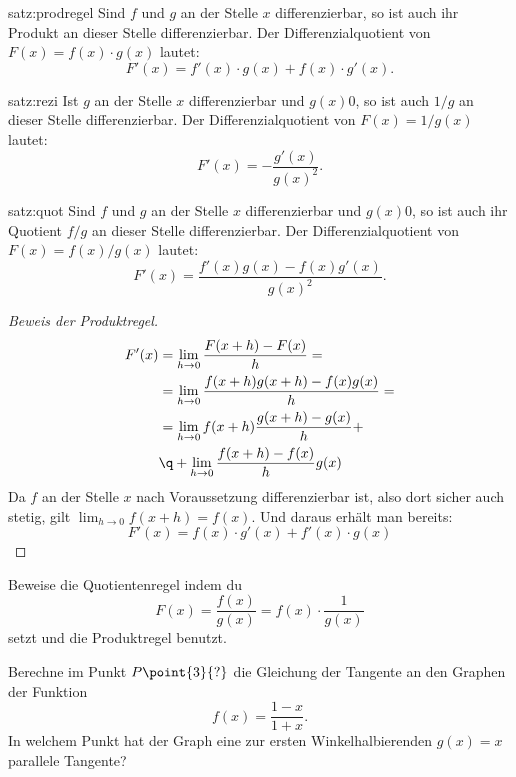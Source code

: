 \documentclass[%
11pt,%
twoside,%
titlepage,%
german,%
headsepline%
]{scrartcl}
\begin{document}
\begin{csatz}{satz:prodregel}
Sind
$f$ und $g$ an der Stelle $x$ differenzierbar, so ist auch ihr Produkt an dieser Stelle differenzierbar. Der Differenzialquotient von $F(x)=f(x)\cdot g(x)$ lautet:
$$F'(x)=f'(x)\cdot g(x)+f(x)\cdot g'(x).$$
\end{csatz}
\begin{csatz}{satz:rezi}
Ist
$g$ an der Stelle $x$ differenzierbar und $g(x)­0$, so ist auch $1/g$ an dieser Stelle differenzierbar. Der Differenzialquotient von $F(x)=1/g(x)$ lautet:
$$F'(x)=-\frac{g'(x)}{g(x)^2}.$$
\end{csatz}
\begin{csatz}{satz:quot}
Sind $f$ und $g$ an der Stelle $x$ differenzierbar und $g(x)­0$, so ist auch ihr Quotient $f/g$ an dieser Stelle differenzierbar. Der Differenzialquotient von $F(x)=f(x)/g(x)$ lautet:
$$F'(x)=\frac{f'(x)g(x)-f(x)g'(x)}{g(x)^2}.$$
\end{csatz}
\begin{proof}[Beweis der Produktregel]
\begin{align*}
F'(x)&=\lim_{h\to0}\frac{F(x+h)-F(x)}{h}=\\
&=\lim_{h\to0}\frac{f(x+h)g(x+h)-f(x)g(x)}{h}=\\
&=\lim_{h\to0}f(x+h)\frac{g(x+h)-g(x)}{h}+\\
&\q+\lim_{h\to0}\frac{f(x+h)-f(x)}{h}g(x)
\end{align*}
Da $f$ an der Stelle $x$ nach Voraussetzung differenzierbar ist, also dort sicher auch stetig, gilt $\lim_{h\to0}f(x+h)=f(x)$. Und daraus erh\"alt man bereits:
$$F'(x)=f(x)\cdot g'(x)+f'(x)\cdot g(x)$$
\end{proof}

\begin{ueb}[Quotientenregel]\label{uebquotientenregel}
Beweise die Quotientenregel indem du
$$F(x)=\frac{f(x)}{g(x)}=f(x)\cdot\frac{1}{g(x)}$$
setzt und die Produktregel benutzt.
\end{ueb}

\begin{ueb}[Tangente]\label{uebtangenten}
Berechne im Punkt $P\point{3}{?}$ die Gleichung der Tangente an den Graphen der Funktion
$$f(x)=\frac{1-x}{1+x}.$$
In welchem Punkt hat der Graph eine zur ersten Winkelhalbierenden $g(x)=x$ parallele Tangente?
\end{ueb}
\end{document}
